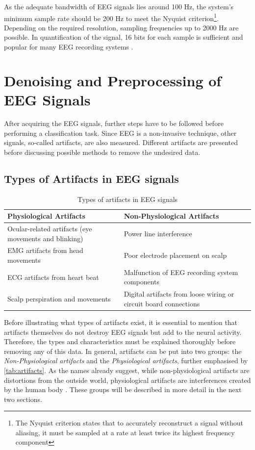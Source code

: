     As the adequate bandwidth of \ac{EEG} signals lies around 100 Hz, the system's minimum sample rate should be 200 Hz to meet the Nyquist criterion\footnote{The Nyquist criterion states that to accurately reconstruct a signal without aliasing, it must be sampled at a rate at least twice its highest frequency component}. Depending on the required resolution, sampling frequencies up to 2000 Hz are possible. In quantification of the signal, 16 bits for each sample is sufficient and popular for many \ac{EEG} recording systems \cite{sanei2021eeg}. \par
    
  \section{Denoising and Preprocessing of EEG Signals}\label{section:theoretical_background_denoising}
    After acquiring the EEG signals, further steps have to be followed before performing a classification task. Since \ac{EEG} is a non-invasive technique, other signals, so-called artifacts, are also measured. Different artifacts are presented before discussing possible methods to remove the undesired data.
    \subsection{Types of Artifacts in EEG signals}
    \begin{table}[h]
      \centering
      \begin{tabular}{|>{\raggedright\arraybackslash}m{}|>{\raggedright\arraybackslash}m{}|}
        \hline
        \textbf{Physiological Artifacts} & \textbf{Non-Physiological Artifacts} \\
        \hline
        Ocular-related artifacts (eye movements and blinking) & Power line interference \\
        \hline
        \ac{EMG} artifacts from head movements & Poor electrode placement on scalp \\
        \hline
        \ac{ECG} artifacts from heart beat & Malfunction of EEG recording system components \\
        \hline
        Scalp perspiration and movements & Digital artifacts from loose wiring or circuit board connections \\
        \hline
      \end{tabular}
      \caption{Types of artifacts in EEG signals \cite{hu2019eeg}}
      \label{tab:artifacts}
    \end{table}
      Before illustrating what types of artifacts exist, it is essential to mention that artifacts themselves do not destroy \ac{EEG} signals but add to the neural activity. Therefore, the types and characteristics must be explained thoroughly before removing any of this data. In general, artifacts can be put into two groups: the \textit{Non-Physiological artifacts} and the \textit{Physiological artifacts}, further emphasised by \autoref{tab:artifacts}. As the names already suggest, while non-physiological artifacts are distortions from the outside world, physiological artifacts are interferences created by the human body \cite{hu2019eeg}. These groups will be described in more detail in the next two sections.
